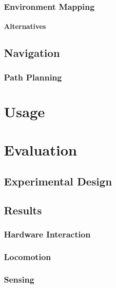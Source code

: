 \documentclass{l4proj}
\begin{document}
\subsection{Environment Mapping}
\subsubsection{Alternatives}

\section{Navigation}

\subsection{Path Planning}


\chapter{Usage}


\chapter{Evaluation}

\section{Experimental Design}

\section{Results}
\subsection{Hardware Interaction}
\subsection{Locomotion}
\subsection{Sensing}
\end{document}
